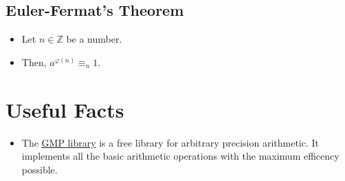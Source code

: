 \documentclass[12pt, a4paper, english]{report}
\begin{document}
\subsection{Euler-Fermat's Theorem}\label{euler_fermat_th}
\begin{itemize}
    \item Let $n \in \mathbb{Z}$ be a number.
    \item Then, $a^{\varphi(n)} \equiv_{n} 1$.
\end{itemize}



\section{Useful Facts}
\begin{itemize}
    \item The \href{https://gmplib.org/}{GMP library} is a free library for arbitrary precision arithmetic. It implements all the basic arithmetic operations with the maximum efficency possible.
\end{itemize}

\listofalgorithms
\end{document}
